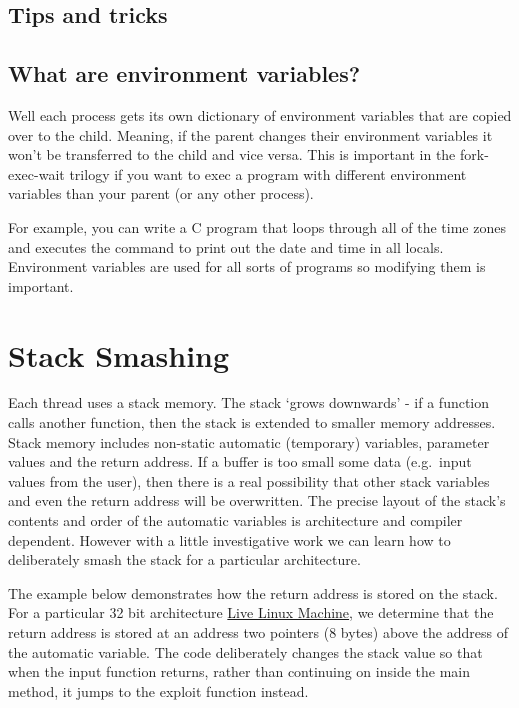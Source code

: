 
\subsection{Tips and tricks}


\subsection{What are environment variables?}

Well each process gets its own dictionary of environment variables that are copied over to the child. Meaning, if the parent changes their environment variables it won't be transferred to the child and vice versa. This is important in the fork-exec-wait trilogy if you want to exec a program with different environment variables than your parent (or any other process).

For example, you can write a C program that loops through all of the time zones and executes the  command to print out the date and time in all locals. Environment variables are used for all sorts of programs so modifying them is important.

\section{Stack Smashing}

Each thread uses a stack memory. The stack `grows downwards' - if a function calls another function, then the stack is extended to smaller memory addresses. Stack memory includes non-static automatic (temporary) variables, parameter values and the return address. If a buffer is too small some data (e.g.~input values from the user), then there is a real possibility that other stack variables and even the return address will be overwritten. The precise layout of the stack's contents and order of the automatic variables is architecture and compiler dependent. However with a little investigative work we can learn how to deliberately smash the stack for a particular architecture.

The example below demonstrates how the return address is stored on the stack. For a particular 32 bit architecture \href{http://cs-education.github.io/sys/}{Live Linux Machine}, we determine that the return address is stored at an address two pointers (8 bytes) above the address of the automatic variable. The code deliberately changes the stack value so that when the input function returns, rather than continuing on inside the main method, it jumps to the exploit function instead.

